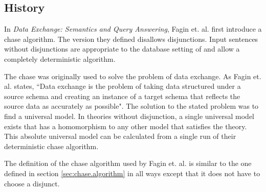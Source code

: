 	\subsection{History}

		In \cite{FKMP02} \emph{Data Exchange: Semantics and Query Answering},
		Fagin et. al. first introduce a chase algorithm. The version they
		defined disallows disjunctions. Input sentences without disjunctions
		are appropriate to the database setting of \cite{FKMP02} and allow a
		completely deterministic algorithm.

		The chase was originally used to solve the problem of data exchange. As
		Fagin et. al. states, ``Data exchange is the problem of taking data
		structured under a source schema and creating an instance of a target
		schema that reflects the source data as accurately as possible". The
		solution to the stated problem was to find a universal model. In theories
		without disjunction, a single universal model exists that has a
		homomorphism to any other model that satisfies the theory. This
		absolute universal model can be calculated from a single run of their
		deterministic chase algorithm.

		The definition of the chase algorithm used by Fagin et. al. is similar
		to the one defined in section \ref{sec:chase.algorithm} in all ways
		except that it does not have to choose a disjunct.
